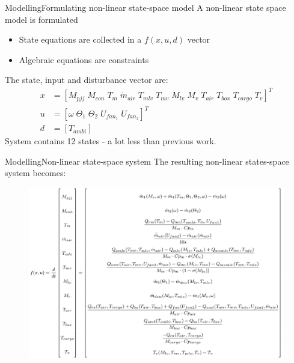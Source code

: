 \begin{frame}{Modelling}{Formulating non-linear state-space model}
	A non-linear state space model is formulated
	\begin{itemize}
		\item State equations are collected in a $f(x,u,d)$ vector
		\item Algebraic equations are constraints
	\end{itemize}

	The state, input and disturbance vector are:
	\begin{equation}  \label{eq:xu}
		\begin{split}
			x & = [M_{pjj}	\;
				M_{con} \;
				T_m \;
				\dot{m}_{air}\;
				T_{mlv}      \;
				T_{mv}       \;
				M_{lv}       \;
				M_v          \;
				T_{air}      \;
				T_{box}      \;
				T_{cargo}    \;
				T_v]^T \\
			u & = [\omega	\;
				\Theta_1	\;
				\Theta_2     \;
				U_{fan_1}    \;
				U_{fan_2}]^T \\
			d & = [T_{ambi}]
		\end{split}
	\end{equation}
	System contains 12 states - a lot less than previous work.

\end{frame}




\begin{frame}{Modelling}{Non-linear state-space system}
	The resulting non-linear states-space system becomes:
	\begin{figure}[h!]
		\centering
		\includegraphics[width=1.04\textwidth]{Graphics/f_x_u.jpeg}
		\label{fig:f_x_u}
	\end{figure}
\end{frame}





